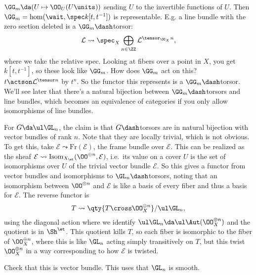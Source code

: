 \begin{example}[?]

\(\GG_m \da (U\mapsto \OO_U(U\units))\) sending \(U\) to the invertible
functions of \(U\). Then \(\GG_m = \hom(\wait, \spec k[t, t^{-1}])\) is
representable. E.g. a line bundle with the zero section deleted is a
\(\GG_m\dash\)torsor:
\begin{align*}  
\mathcal{L} \leadsto \spec_X \bigoplus_{n\in \ZZ} \mathcal{L}^{\tensor_{\OO_X} n}
,\end{align*} where we take the relative spec. Looking at fibers over a
point in \(X\), you get \(k[t, t^{-1}]\), so these look like \(\GG_m\).
How does \(\GG_m\) act on this? \(t\actson \mathcal{L}^{\tensor n}\) by
\(t^n\). So the functor this represents is a \(\GG_m\dash\)torsor. We'll
see later that there's a natural bijection between \(\GG_m\dash\)torsors
and line bundles, which becomes an equivalence of categories if you only
allow isomorphisms of line bundles.

\end{example}

\begin{example}[?]

For \(G \da \ul \GL_n\), the claim is that \(G\dash\)torsors are in
natural bijection with vector bundles of rank \(n\). Note that they are
locally trivial, which is not obvious. To get this, take
\(\mathcal{E}\leadsto \mathrm{Fr}(\mathcal{E})\), the frame bundle over
\(\mathcal{E}\). This can be realized as the sheaf
\(\mathcal{E}\leadsto \mathrm{Isom}_{X_\et}(\OO^{\oplus n}, \mathcal{E})\),
i.e.~its value on a cover \(U\) is the set of isomorphisms over \(U\) of
the trivial vector bundle \(\mathcal{E}\). So this gives a functor from
vector bundles and isomorphisms to \(\GL_n\dash\)torsors, noting that an
isomorphism between \(\OO^{\oplus n}\) and \(\mathcal{E}\) is like a
basis of every fiber and thus a basis for \(\mathcal{E}\). The reverse
functor is
\begin{align*}  
T \leadsto \qty{T\cross \OO_X^{\oplus n}} / \ul \GL_n
,\end{align*} using the diagonal action where we identify
\(\ul \GL_n \da \ul\Aut(\OO_X^{\oplus n})\) and the quotient is in
\(\Sh^\et\). This quotient kills \(T\), so each fiber is isomorphic to
the fiber of \(\OO_X^{\oplus n}\), where this is like \(\GL_n\) acting
simply transitively on \(T\), but this twist \(\OO_X^{\oplus n}\) in a
way corresponding to how \(\mathcal{E}\) is twisted.

\begin{exercise}[?]

Check that this is vector bundle. This uses that \(\GL_n\) is smooth.

\end{exercise}

\end{example}

